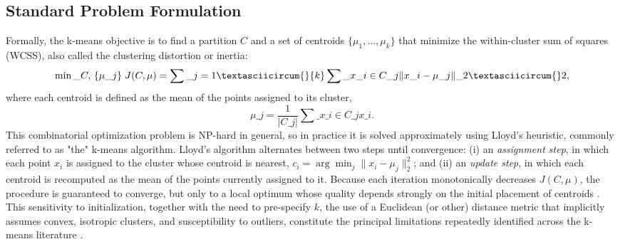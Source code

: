 \subsection{Standard Problem Formulation}
Formally, the k-means objective is to find a partition $C$ and a set of centroids $\{\mu_1,\dots,\mu_k\}$ that minimize the within-cluster sum of squares (WCSS), also called the clustering distortion or inertia:
\begin{equation}
\min\_{C,\,\{\mu\_j\}} \; J(C,\mu) = \sum\_{j=1}\textasciicircum{}{k} \sum\_{x\_i \in C\_j} \lVert x\_i - \mu\_j \rVert\_2\textasciicircum{}2,
\end{equation}
where each centroid is defined as the mean of the points assigned to its cluster,
\begin{equation}
\mu\_j = \frac{1}{|C\_j|} \sum\_{x\_i \in C\_j} x\_i.
\end{equation}
This combinatorial optimization problem is NP-hard in general, so in practice it is solved approximately using Lloyd's heuristic, commonly referred to as "the" k-means algorithm. Lloyd's algorithm alternates between two steps until convergence: (i) an \emph{assignment step}, in which each point $x_i$ is assigned to the cluster whose centroid is nearest, $c_i = \arg\min_j \lVert x_i - \mu_j\rVert_2^2$; and (ii) an \emph{update step}, in which each centroid is recomputed as the mean of the points currently assigned to it. Because each iteration monotonically decreases $J(C,\mu)$, the procedure is guaranteed to converge, but only to a local optimum whose quality depends strongly on the initial placement of centroids \cite{celebi2012comparative}. This sensitivity to initialization, together with the need to pre-specify $k$, the use of a Euclidean (or other) distance metric that implicitly assumes convex, isotropic clusters, and susceptibility to outliers, constitute the principal limitations repeatedly identified across the k-means literature \cite{chong2021means,oti2021comprehensive,sinaga2020unsupervised}.

